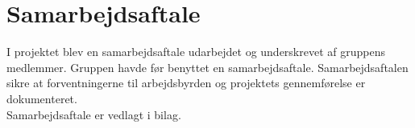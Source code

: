 \section{Samarbejdsaftale}
I projektet blev en samarbejdsaftale udarbejdet og underskrevet af gruppens medlemmer. 
Gruppen havde før benyttet en samarbejdsaftale. Samarbejdsaftalen sikre at forventningerne til arbejdsbyrden og projektets gennemførelse er dokumenteret. \\
Samarbejdsaftale er vedlagt i bilag. \\
